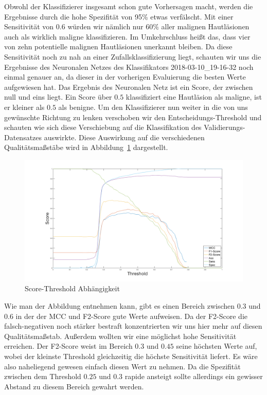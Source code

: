 Obwohl der Klassifizierer insgesamt schon gute Vorhersagen macht, werden die Ergebnisse durch die hohe Spezifität von 95\% etwas verfälscht. Mit einer Sensitivität von $0.6$ würden wir nämlich nur $60\%$ aller malignen Hautläsionen auch als wirklich maligne klassifizieren. Im Umkehrschluss heißt das, dass vier von zehn potentielle malignen Hautläsionen unerkannt bleiben. Da diese Sensitivität noch zu nah an einer Zufallsklassifizierung liegt, schauten wir uns die Ergebnisse des Neuronalen Netzes des Klassifikators 2018-03-10\_19-16-32 noch einmal genauer an, da dieser in der vorherigen Evaluierung die besten Werte aufgewiesen hat. Das Ergebnis des Neuronalen Netz ist ein Score, der zwischen null und eins liegt. Ein Score über $0.5$ klassifiziert eine Hautläsion als maligne, ist er kleiner als $0.5$ als benigne. Um den Klassifizierer nun weiter in die von uns gewünschte Richtung zu lenken verschoben wir den Entscheidungs-Threshold und schauten wie sich diese Verschiebung auf die Klassifikation des Validierungs-Datensatzes auswirkte. Diese Auswirkung auf die verschiedenen Qualitätsmaßstäbe wird in Abbildung~\ref{fig:threshold} dargestellt. 

\begin{figure}[htb!]
	\begin{center}
		\includegraphics[width=\textwidth]{./pics/evaluation/treshold.png}
		\caption{Score-Threshold Abhängigkeit}
		\label{fig:threshold}
    \end{center}
\end{figure}

Wie man der Abbildung entnehmen kann, gibt es einen Bereich zwischen $0.3$ und $0.6$ in der der MCC und F2-Score gute Werte aufweisen. Da der F2-Score die falsch-negativen noch stärker bestraft konzentrierten wir uns hier mehr auf diesen Qualitätsmaßstab. Außerdem wollten wir eine möglichst hohe Sensitivität erreichen. Der F2-Score weist im Bereich $0.3$ und $0.45$ seine höchsten Werte auf, wobei der kleinste Threshold gleichzeitig die höchste Sensitivität liefert. Es wäre also naheliegend gewesen einfach diesen Wert zu nehmen. Da die Spezifität zwischen dem Threshold $0.25$ und $0.3$ rapide ansteigt sollte allerdings ein gewisser Abstand zu diesem Bereich gewahrt werden. 

